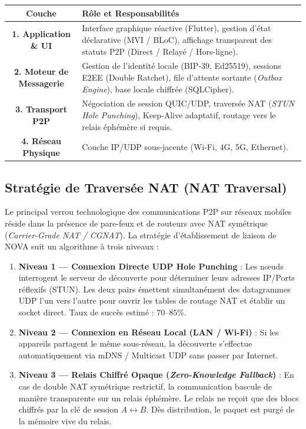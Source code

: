 \documentclass[11pt,a4paper]{article}
\begin{document}
\begin{center}
\begin{tabularx}{0.95\textwidth}{|c|X|}
\hline
\rowcolor{novasurface2!20} \textbf{Couche} & \textbf{Rôle et Responsabilités} \\ \hline
\textbf{1. Application \& UI} & Interface graphique réactive (Flutter), gestion d'état déclarative (MVI / BLoC), affichage transparent des statuts P2P (Direct / Relayé / Hors-ligne). \\ \hline
\textbf{2. Moteur de Messagerie} & Gestion de l'identité locale (BIP-39, Ed25519), sessions E2EE (Double Ratchet), file d'attente sortante (\textit{Outbox Engine}), base locale chiffrée (SQLCipher). \\ \hline
\textbf{3. Transport P2P} & Négociation de session QUIC/UDP, traversée NAT (\textit{STUN Hole Punching}), Keep-Alive adaptatif, routage vers le relais éphémère si requis. \\ \hline
\textbf{4. Réseau Physique} & Couche IP/UDP sous-jacente (Wi-Fi, 4G, 5G, Ethernet). \\ \hline
\end{tabularx}
\end{center}

\subsection{Stratégie de Traversée NAT (NAT Traversal)}
Le principal verrou technologique des communications P2P sur réseaux mobiles réside dans la présence de pare-feux et de routeurs avec NAT symétrique (\textit{Carrier-Grade NAT / CGNAT}). La stratégie d'établissement de liaison de NOVA suit un algorithme à trois niveaux :

\begin{enumerate}[leftmargin=1.2cm]
    \item \textbf{Niveau 1 — Connexion Directe UDP Hole Punching} : 
    Les nœuds interrogent le serveur de découverte pour déterminer leurs adresses IP/Ports réflexifs (STUN). Les deux pairs émettent simultanément des datagrammes UDP l'un vers l'autre pour ouvrir les tables de routage NAT et établir un socket direct. Taux de succès estimé : $70\text{--}85\%$.
    \item \textbf{Niveau 2 — Connexion en Réseau Local (LAN / Wi-Fi)} : 
    Si les appareils partagent le même sous-réseau, la découverte s'effectue automatiquement via mDNS / Multicast UDP sans passer par Internet.
    \item \textbf{Niveau 3 — Relais Chiffré Opaque (\textit{Zero-Knowledge Fallback})} : 
    En cas de double NAT symétrique restrictif, la communication bascule de manière transparente sur un relais éphémère. Le relais ne reçoit que des blocs chiffrés par la clé de session $A \leftrightarrow B$. Dès distribution, le paquet est purgé de la mémoire vive du relais.
\end{enumerate}
\end{document}
